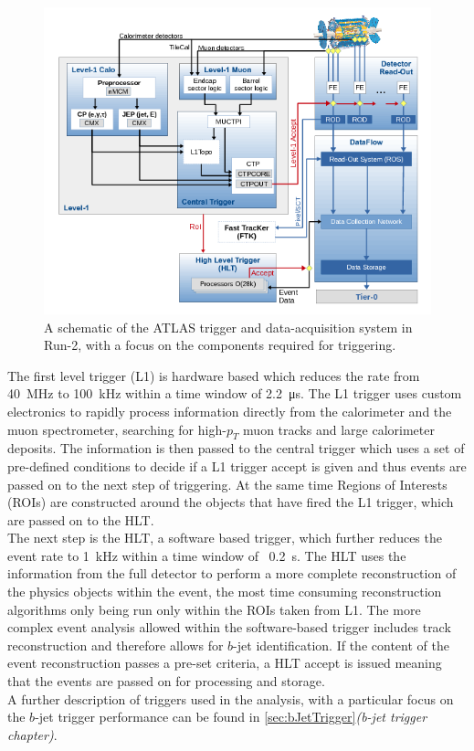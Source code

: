\begin{figure}[!ht]
  \begin{center}
    \includegraphics[width=1\linewidth, angle=0]{figs/Detector/trigger_schem.png}
  \end{center}
  \caption{A schematic of the ATLAS trigger and data-acquisition system in Run-2, with a focus on the components required for triggering.}
  \label{fig:det-trigger_schem}
\end{figure}

The first level trigger (L1) is hardware based which reduces the rate from 40~MHz to 100~kHz within a time window of \SI{2.2}{\micro\second}.
The L1 trigger uses custom electronics to rapidly process information directly from the
calorimeter and the muon spectrometer, searching for high-$p_{T}$ muon tracks and large calorimeter deposits.
The information is then passed to the central trigger which uses a set of pre-defined conditions
to decide if a L1 trigger accept is given and thus events are passed on to the next step of triggering.
At the same time Regions of Interests (ROIs) are constructed around the objects that have fired the L1 trigger,
which are passed on to the HLT. \\

The next step is the HLT, a software based trigger,
which further reduces the event rate to 1~kHz within a time window of ~\SI{0.2}{\second}.
The HLT uses the information from the full detector
to perform a more complete reconstruction of the physics objects within the event,
the most time consuming reconstruction algorithms only being run only within the ROIs taken from L1.
The more complex event analysis allowed within the software-based trigger includes
track reconstruction and therefore allows for $b$-jet identification.
If the content of the event reconstruction passes a pre-set criteria, a HLT accept is issued
meaning that the events are passed on for processing and storage. \\

A further description of triggers used in the analysis,
with a particular focus on the $b$-jet trigger performance
can be found in \ref{sec:bJetTrigger}\textit{(b-jet trigger chapter)}.

